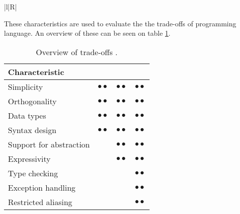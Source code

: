 \begin{table}[H]
\begin{tabularx}{\textwidth}{|l|R|}
	\end{tabularx}
	\caption{Brief explanation of language characteristics \citep{sebesta}.}
	\label{tab:langCharacteristics}
\end{table}
These characteristics are used to evaluate the the trade-offs of programming language. An overview of these can be seen on table \ref{tab:langTradeOffs}.

\begin{table}[H]
	\begin{tabular}{l|c|c|c|}
\textbf{Characteristic}	& \rotatebox{90}{Readability} &\rotatebox{90}{Writability} & \rotatebox{90}{Reliability} \\ \hline
Simplicity 				& $\bullet{•}$	& $\bullet{•}$	& $\bullet{•}$ \\ \hline
Orthogonality			& $\bullet{•}$	& $\bullet{•}$	& $\bullet{•}$ \\ \hline
Data types 				& $\bullet{•}$	& $\bullet{•}$	& $\bullet{•}$ \\ \hline
Syntax design 			& $\bullet{•}$	& $\bullet{•}$	& $\bullet{•}$ \\ \hline
Support for abstraction	& ~ 			& $\bullet{•}$ 	& $\bullet{•}$ \\ \hline
Expressivity 			& ~ 			& $\bullet{•}$ 	& $\bullet{•}$ \\ \hline
Type checking 			& ~ 			& ~ 			& $\bullet{•}$ \\ \hline
Exception handling 		& ~ 			& ~ 			& $\bullet{•}$ \\ \hline
Restricted aliasing 	& ~ 			& ~ 			& $\bullet{•}$ \\ \hline
	\end{tabular}
	\caption{Overview of trade-offs \citep{sebesta}.}
	\label{tab:langTradeOffs}
\end{table}

